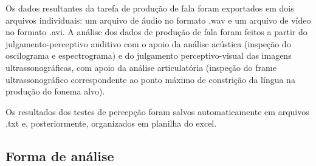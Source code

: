 \documentclass[output=paper,colorlinks,citecolor=brown,booklanguage=portuguese]{langscibook}
\begin{document}
Os dados resultantes da tarefa de produção de fala foram exportados em dois arquivos individuais: um arquivo de áudio no formato .wav e um arquivo de vídeo no formato .avi. A análise dos dados de produção de fala foram feitos a partir do julgamento-perceptivo auditivo com o apoio da análise acústica (inspeção do oscilograma e espectrograma) e do julgamento perceptivo-visual das imagens ultrassonográficas, com apoio da análise articulatória (inspeção do frame ultrassonográfico correspondente ao ponto máximo de constrição da língua na produção do fonema alvo).

Os resultados dos testes de percepção foram salvos  automaticamente em arquivos .txt e, posteriormente, organizados em planilha do excel.

\subsection{Forma de análise}
\end{document}
